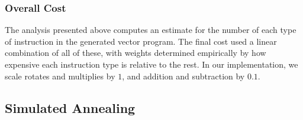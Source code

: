 \subsubsection*{Overall Cost}
The analysis presented above computes an estimate for the number of each type of instruction in the generated vector program.
The final cost used a linear combination of all of these, with weights determined empirically by how expensive each instruction type is relative to the rest.
In our implementation, we scale rotates and multiplies by $1$, and addition and subtraction by $0.1$. 

\subsection{Simulated Annealing}





